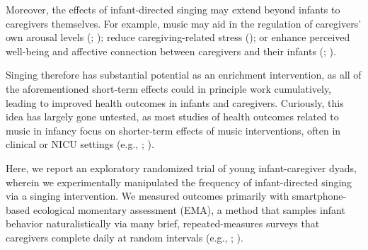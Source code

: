 \documentclass[
]{article}
\begin{document}
Moreover, the effects of infant-directed singing may extend beyond
infants to caregivers themselves. For example, music may aid in the
regulation of caregivers' own arousal levels
(;
); reduce
caregiving-related stress ();
or enhance perceived well-being and affective connection between
caregivers and their infants (; ).

Singing therefore has substantial potential as an enrichment
intervention, as all of the aforementioned short-term effects could in
principle work cumulatively, leading to improved health outcomes in
infants and caregivers. Curiously, this idea has largely gone untested,
as most studies of health outcomes related to music in infancy focus on
shorter-term effects of music interventions, often in clinical or NICU
settings (e.g., ;
).

Here, we report an exploratory randomized trial of young
infant-caregiver dyads, wherein we experimentally manipulated the
frequency of infant-directed singing via a singing intervention. We
measured outcomes primarily with smartphone-based ecological momentary
assessment (EMA), a method that samples infant behavior naturalistically
via many brief, repeated-measures surveys that caregivers complete daily
at random intervals (e.g., ; ).

\clearpage

\begingroup\fontsize{6}{8}\selectfont
\end{document}
